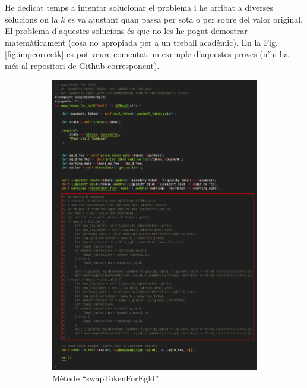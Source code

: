 \documentclass[11pt,a4paper]{article}
\begin{document}
He dedicat temps a intentar solucionar el problema i he arribat a diverses solucions on la \(k\) es va ajustant quan passa per sota o per sobre del valor original. El problema d'aquestes solucions és que no les he pogut demostrar matemàticament (cosa no apropiada per a un treball acadèmic). En la Fig. \ref{fig:impcorrectk} es pot veure comentat un exemple d'aquestes proves (n'hi ha més al repositori de Github corresponent).

\begin{figure}[!htb]
\begin{subfigure}[b]{0.47\textwidth}
  \includegraphics[width=\linewidth]{imp-sc01.png}
  \caption{Mètode ``swapTokenForEgld''.}\label{fig:impsc01}
\end{subfigure}\hfill
\begin{subfigure}[b]{0.47\textwidth}

\end{subfigure}
\end{figure}
\end{document}
